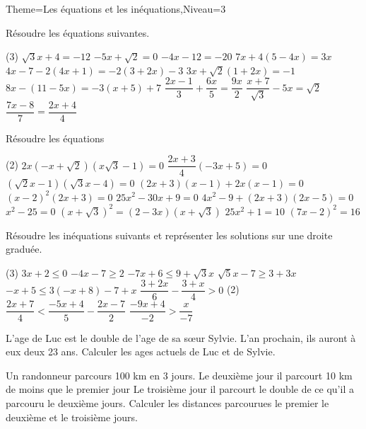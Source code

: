 \documentclass[a4paper,12pt]{article}
\begin{document}
\begin{Maquette}[Fiche]{Theme=Les équations et les inéquations,Niveau=3}

\begin{exercice}
Résoudre les équations suivantes.
\begin{tasks}(3)
\task $\sqrt{3}x+4=-12$
\task $-5x+\sqrt{2}=0$
\task $-4x-12=-20$
\task $7x+4(5-4x)=3x$
\task* $4x-7-2(4x+1)=-2(3+2x)-3$
\task $3x+\sqrt{2}(1+2x)=-1$
\task* $8x-(11-5x)=-3(x+5)+7$
\task $\dfrac{2x-1}{3}+\dfrac{6x}{5}=\dfrac{9x}{2}$
\task $\dfrac{x+7}{\sqrt{3}}-5x=\sqrt{2}$
\task $\dfrac{7x-8}{7}=\dfrac{2x+4}{4}$
\end{tasks}
\end{exercice}

\begin{exercice}
Résoudre les équations
\begin{tasks}(2)
\task $2x(-x+\sqrt{2})(x\sqrt{3}-1)=0$
\task $\dfrac{2x+3}{4}(-3x+5)=0$
\task $(\sqrt{2}x-1)(\sqrt{3}x-4)=0$
\task $(2x+3)(x-1)+2x(x-1)=0$
\task $(x-2)^{2}(2x+3)=0$
\task $25x^{2}-30x+9=0$
\task $4x^{2}-9+(2x+3)(2x-5)=0$
\task $x^{2}-25=0$
\task $(x+\sqrt{3})^{2}=(2-3x)(x+\sqrt{3})$
\task $25x^{2}+1=10$
\task $(7x-2)^{2}=16$
\end{tasks}
\end{exercice}

\begin{exercice}
Résoudre les inéquations suivants et représenter les solutions sur une droite graduée.
\begin{tasks}(3)
\task $3x+2\leq 0$
\task $-4x-7\geq 2$
\task $-7x+6\leq 9+\sqrt{3}x$
\task $\sqrt{5}x-7\geq 3+3x$
\task $-x+5\leq 3(-x+8)-7+x$
\task $\dfrac{3+2x}{6}-\dfrac{3+x}{4}>0$
\task*(2) $\dfrac{2x+7}{4}< \dfrac{-5x+4}{5}-\dfrac{2x-7}{2}$
\task $\dfrac{-9x+4}{-2}>\dfrac{x}{-7}$
\end{tasks}
\end{exercice}

\begin{exercice}
L'age de Luc est le double de l'age de sa
sœur Sylvie. L'an prochain, ils auront à
eux deux 23 ans. Calculer les ages
actuels de Luc et de Sylvie. 
\end{exercice}

\begin{exercice}
Un randonneur parcours 100 km en 3
jours.
Le deuxième jour il parcourt 10 km de
moins que le premier jour
Le troisième jour il parcourt le double de
ce qu'il a parcouru le deuxième jours.
Calculer les distances parcourues le
premier le deuxième et le troisième jours.
\end{exercice}


\end{Maquette}
\end{document}

